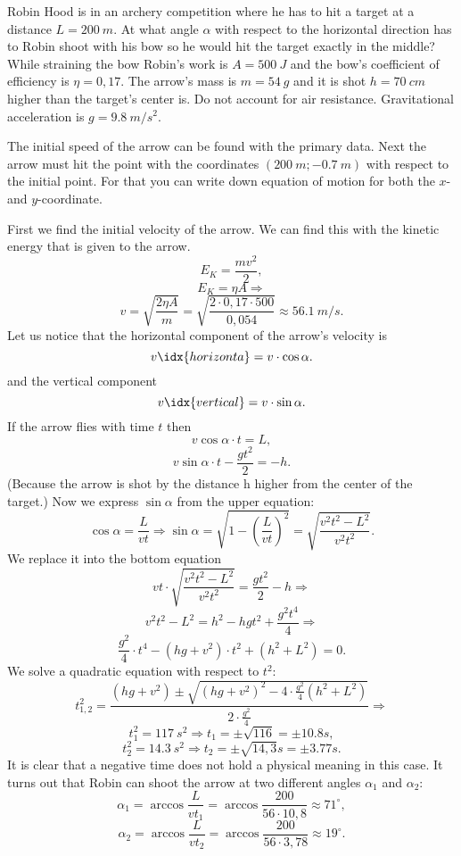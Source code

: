 {\ifEngStatement
Robin Hood is in an archery competition where he has to hit a target at a distance $L=\SI{200}{m}$. At what angle $\alpha$ with respect to the horizontal direction has to Robin shoot with his bow so he would hit the target exactly in the middle? While straining the bow Robin’s work is $A=\SI{500}{J}$ and the bow’s coefficient of efficiency is $\eta=0,17$. The arrow’s mass is $m=\SI{54}{g}$ and it is shot $h=\SI{70}{cm}$ higher than the target’s center is. Do not account for air resistance. Gravitational acceleration is $g=\SI{9,8}{m/s^2}$.
\fi


\ifEngHint
The initial speed of the arrow can be found with the primary data. Next the arrow must hit the point with the coordinates $(\SI{200}{m};\SI{-0,7}{m})$ with respect to the initial point. For that you can write down equation of motion for both the $x$- and $y$-coordinate.
\fi


\ifEngSolution
First we find the initial velocity of the arrow. We can find this with the kinetic energy that is given to the arrow.
$$ E_{K}=\frac{m v^2}{2},$$ 
$$E_{K}=\eta A \Rightarrow$$
$$v=\sqrt{\frac{2\eta A}{m}}=\sqrt{\frac{2\cdot0,17\cdot 500}{0,054}}\approx \SI{56,1}{m/s}.$$
Let us notice that the horizontal component of the arrow’s velocity is 
$$v\idx{horizonta}=v\cdot \cos\alpha.$$ 
and the vertical component
$$v\idx{vertical}=v\cdot \sin\alpha.$$ 
If the arrow flies with time $t$ then 
$$v \cos\alpha\cdot t=L,$$ 
$$v \sin\alpha\cdot t-\frac{g t^2}{2}=-h. $$
(Because the arrow is shot by the distance h higher from the center of the target.) 
Now we express $\sin\alpha$ from the upper equation:
$$\cos\alpha=\frac{L}{vt} \Rightarrow \sin\alpha=\sqrt{1-\left(\frac{L}{vt}\right)^2}=\sqrt{\frac{v^2t^2-L^2}{v^2t^2}}.$$ 
We replace it into the bottom equation
$$vt\cdot \sqrt{\frac{v^2t^2-L^2}{v^2t^2}}=\frac{g t^2}{2}-h \Rightarrow$$ 
$$v^2t^2-L^2=h^2 - hgt^2+\frac{g^2 t^4}{4}  \Rightarrow$$
$$\frac{g^2}{4}\cdot t^4 - \left(hg+v^2\right)\cdot t^2 + \left(h^2+L^2\right)=0.$$
We solve a quadratic equation with respect to $t^2$:
$$t^2_{1,2}=\frac{\left(hg+v^2\right)\pm\sqrt{\left(hg+v^2\right)^2-4\cdot \frac{g^2}{4}\left(h^2+L^2\right)}}{2\cdot \frac{g^2}{4}} \Rightarrow$$ 
$$t^2_{1}=\SI{117}{s^2}  \Rightarrow t_{1}=\pm\sqrt{116}=\pm \SI{10,8}s,$$
$$t^2_{2}=\SI{14,3}{s^2} \Rightarrow t_{2}=\pm \sqrt{14,3}\SI{}s=\pm \SI{3,77}s.$$
It is clear that a negative time does not hold a physical meaning in this case. It turns out that Robin can shoot the arrow at two different angles $\alpha_{1}$ and $\alpha_{2}$:
$$\alpha_{1}= \arccos\frac{L}{vt_{1}}=\arccos\frac{200}{56\cdot10,8}\approx 71^\circ ,$$ 
$$\alpha_{2}=\arccos\frac{L}{vt_{2}}=\arccos\frac{200}{56\cdot3,78}\approx 19^\circ .$$
\fi
}